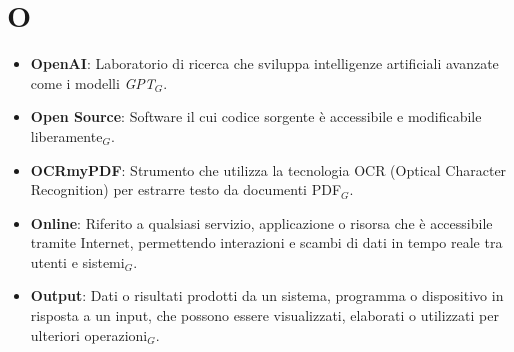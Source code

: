 \section{O}
\begin{itemize}
    \item \textbf{OpenAI}: Laboratorio di ricerca che sviluppa intelligenze artificiali avanzate come i modelli \textit{GPT}$_G$.
    \item \textbf{Open Source}: Software il cui codice sorgente è accessibile e modificabile liberamente$_G$.
    \item \textbf{OCRmyPDF}: Strumento che utilizza la tecnologia OCR (Optical Character Recognition) per estrarre testo da documenti PDF$_G$.
    \item \textbf{Online}: Riferito a qualsiasi servizio, applicazione o risorsa che è accessibile tramite Internet, permettendo interazioni e scambi di dati in tempo reale tra utenti e sistemi$_G$.
    \item \textbf{Output}: Dati o risultati prodotti da un sistema, programma o dispositivo in risposta a un input, che possono essere visualizzati, elaborati o utilizzati per ulteriori operazioni$_G$.
\end{itemize}
